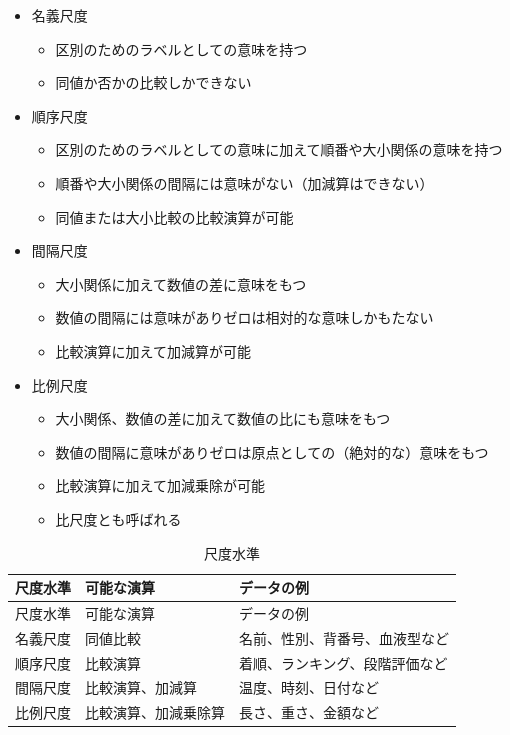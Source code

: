 \documentclass[
  12pt,
]{book}
\providecommand{\tightlist}{%
  \setlength{\itemsep}{0pt}\setlength{\parskip}{0pt}}
\begin{document}
\begin{itemize}
\tightlist
\item
  名義尺度

  \begin{itemize}
  \tightlist
  \item
    区別のためのラベルとしての意味を持つ
  \item
    同値か否かの比較しかできない
  \end{itemize}
\item
  順序尺度

  \begin{itemize}
  \tightlist
  \item
    区別のためのラベルとしての意味に加えて順番や大小関係の意味を持つ
  \item
    順番や大小関係の間隔には意味がない（加減算はできない）
  \item
    同値または大小比較の比較演算が可能
  \end{itemize}
\item
  間隔尺度

  \begin{itemize}
  \tightlist
  \item
    大小関係に加えて数値の差に意味をもつ
  \item
    数値の間隔には意味がありゼロは相対的な意味しかもたない
  \item
    比較演算に加えて加減算が可能
  \end{itemize}
\item
  比例尺度

  \begin{itemize}
  \tightlist
  \item
    大小関係、数値の差に加えて数値の比にも意味をもつ
  \item
    数値の間隔に意味がありゼロは原点としての（絶対的な）意味をもつ
  \item
    比較演算に加えて加減乗除が可能
  \item
    比尺度とも呼ばれる
  \end{itemize}
\end{itemize}

\begin{longtable}[]{@{}lll@{}}
\caption{尺度水準}\tabularnewline
\toprule
尺度水準 & 可能な演算 & データの例 \\
\midrule
\endfirsthead
\toprule
尺度水準 & 可能な演算 & データの例 \\
\midrule
\endhead
名義尺度 & 同値比較 & 名前、性別、背番号、血液型など \\
順序尺度 & 比較演算 & 着順、ランキング、段階評価など \\
間隔尺度 & 比較演算、加減算 & 温度、時刻、日付など \\
比例尺度 & 比較演算、加減乗除算 & 長さ、重さ、金額など \\
\bottomrule
\end{longtable}
\end{document}

